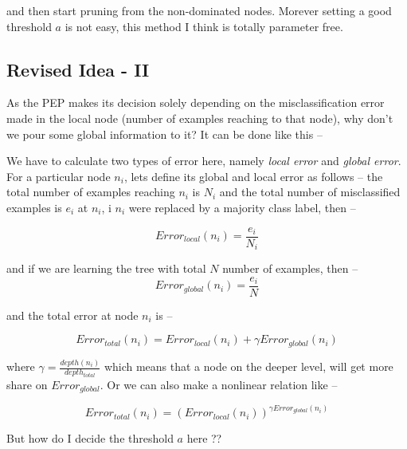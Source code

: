 \documentclass{article}
\begin{document}
and then start pruning from the non-dominated nodes. Morever setting a good threshold \(a\) is not easy, this method I think is totally parameter free.

\subsection{Revised Idea - II}
As the PEP makes its decision solely depending on the misclassification error made in the local node (number of examples reaching to that node), why don't we pour some global information to it? It can be done like this --

We have to calculate two types of error here, namely \textit{local error} and \textit{global error}. For a particular node \(n_i\), lets define its global and local error as follows -- the total number of examples reaching \(n_i\) is \(N_i\) and the total number of misclassified examples is \(e_i\) at \(n_i\), i \(n_i\) were replaced by a majority class label, then --

	\[
		Error_{local}(n_i) = \frac{e_i}{N_i}
	\]

and if we are learning the tree with total \(N\) number of examples, then --
	\[
		Error_{global}(n_i) = \frac{e_i}{N}
	\]

and the total error at node \(n_i\) is --

	\[
		Error_{total}(n_i) = Error_{local}(n_i) + \gamma Error_{global}(n_i) 
	\]

where \(\gamma = \frac{depth(n_i)}{depth_{total}}\) which means that a node on the deeper level, will get more share on \(Error_{global}\). Or we can also make a nonlinear relation like --

	\[
		Error_{total}(n_i) = (Error_{local}(n_i))^{\gamma Error_{global}(n_i)}
	\]

But how do I decide the threshold \(a\) here ??
\end{document}
